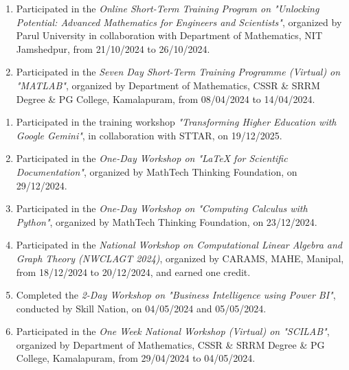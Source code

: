 \begin{enumerate}[label=\protect\circled{\arabic*}, leftmargin=*, itemsep=1ex]
\item Participated in the \emph{Online Short-Term Training Program on "Unlocking Potential: Advanced Mathematics for Engineers and Scientists"}, organized by Parul University in collaboration with Department of Mathematics, NIT Jamshedpur, from 21/10/2024 to 26/10/2024.
\item Participated in the \emph{Seven Day Short-Term Training Programme (Virtual) on "MATLAB"}, organized by Department of Mathematics, CSSR \& SRRM Degree \& PG College, Kamalapuram, from 08/04/2024 to 14/04/2024.
\end{enumerate}

\begin{enumerate}[label=\protect\circled{\arabic*}, leftmargin=*, itemsep=1ex]
\item Participated in the training workshop \emph{"Transforming Higher Education with Google Gemini"}, in collaboration with STTAR, on 19/12/2025.
\item Participated in the \emph{One-Day Workshop on "LaTeX for Scientific Documentation"}, organized by MathTech Thinking Foundation, on 29/12/2024.
\item Participated in the \emph{One-Day Workshop on "Computing Calculus with Python"}, organized by MathTech Thinking Foundation, on 23/12/2024.
\item Participated in the \emph{National Workshop on Computational Linear Algebra and Graph Theory (NWCLAGT 2024)}, organized by CARAMS, MAHE, Manipal, from 18/12/2024 to 20/12/2024, and earned one credit.
\item Completed the \emph{2-Day Workshop on "Business Intelligence using Power BI"}, conducted by Skill Nation, on 04/05/2024 and 05/05/2024.
\item Participated in the \emph{One Week National Workshop (Virtual) on "SCILAB"}, organized by Department of Mathematics, CSSR \& SRRM Degree \& PG College, Kamalapuram, from 29/04/2024 to 04/05/2024.
\end{enumerate}

